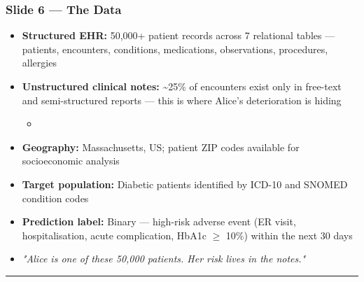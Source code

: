 \documentclass[11pt,a4paper]{article}
\begin{document}
\subsubsection{Slide 6 --- The Data}
\begin{itemize}
\item \textbf{Structured EHR:} 50,000+ patient records across 7 relational tables --- patients, encounters, conditions, medications, observations, procedures, allergies
\item \textbf{Unstructured clinical notes:} \textasciitilde{}25\% of encounters exist only in free-text and semi-structured reports --- this is where Alice's deterioration is hiding
\begin{itemize}
\item [confirm total note count and format split]
\end{itemize}
\item \textbf{Geography:} Massachusetts, US; patient ZIP codes available for socioeconomic analysis
\item \textbf{Target population:} Diabetic patients identified by ICD-10 and SNOMED condition codes
\item \textbf{Prediction label:} Binary --- high-risk adverse event (ER visit, hospitalisation, acute complication, HbA1c $\geq$ 10\%) within the next 30 days
\item \emph{"Alice is one of these 50,000 patients. Her risk lives in the notes."}
\end{itemize}

\noindent\rule{\linewidth}{0.4pt}
\end{document}
